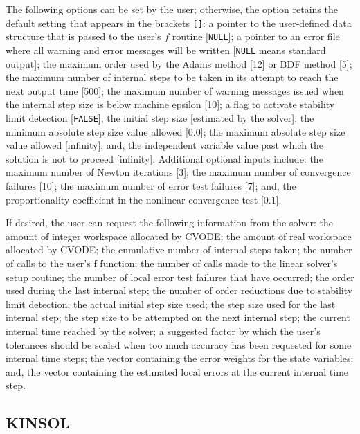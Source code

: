 The following options can be set by the user; otherwise, the option
retains the default setting that appears in the brackets {\tt []}:
a pointer to the user-defined data structure that is passed to the
user's $f$ routine [{\tt NULL}]; a pointer to an error file where all
warning and error messages will be written [{\tt NULL} means standard
output]; the maximum order used by the Adams method [12] or BDF method
[5]; the maximum number of internal steps to be taken in its attempt
to reach the next output time [500]; the maximum number of warning
messages issued when the internal step size is below machine epsilon
[10]; a flag to activate stability limit detection [{\tt FALSE}]; the
initial step size [estimated by the solver]; the minimum absolute step
size value allowed [0.0]; the maximum absolute step size value allowed
[infinity]; and, the independent variable value past which the
solution is not to proceed [infinity].
Additional optional inputs include: the maximum number of Newton
iterations [3]; the maximum number of convergence failures [10]; the
maximum number of error test failures [7]; and, the proportionality
coefficient in the nonlinear convergence test [0.1].

If desired, the user can request the following information from the
solver: the amount of integer workspace allocated by CVODE; the amount
of real workspace allocated by CVODE; the cumulative number of
internal steps taken; the number of calls to the user's
f function; the number of calls made to the linear solver's setup
routine; the number of local error test failures that have occurred;
the order used during the last internal step; the number of order
reductions due to stability limit detection; the actual initial step
size used; the step size used for the last internal step; the step
size to be attempted on the next internal step; the current internal
time reached by the solver; a suggested factor by which the user's
tolerances should be scaled when too much accuracy has been requested
for some internal time steps; the vector containing the error weights
for the state variables; and, the vector containing the estimated
local errors at the current internal time step.

\subsection{KINSOL} 
\label{ss:KINSOL_usage}

